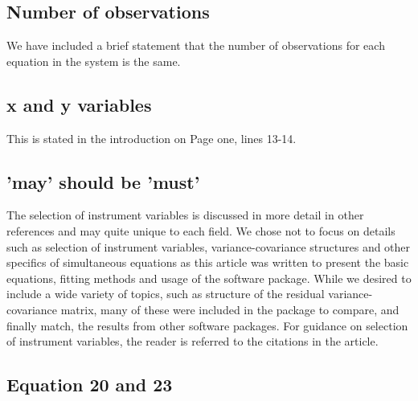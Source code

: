 \documentclass[12pt,english]{scrartcl}
\begin{document}
\subsection{Number of observations}

We have included a brief statement that the number of observations for
each equation in the system is the same. 

\subsection{x and y variables}

This is stated in the introduction on Page one, lines 13-14. 

\subsection{'may' should be 'must'}

The selection of instrument variables is discussed in more detail in
other references and may quite unique to each field. 
We chose not to focus on details such as selection of instrument
variables, variance-covariance structures and other specifics of
simultaneous equations as this article was written to present the
basic equations, fitting methods and usage of the software package.
While we desired to include a wide variety of topics, such as
structure of the residual variance-covariance matrix, many of these
were included in the package to compare, and finally match, the
results from other software packages.
For guidance on selection of instrument variables, the reader is
referred to the citations in the article.

\subsection{Equation 20 and 23}
\end{document}
